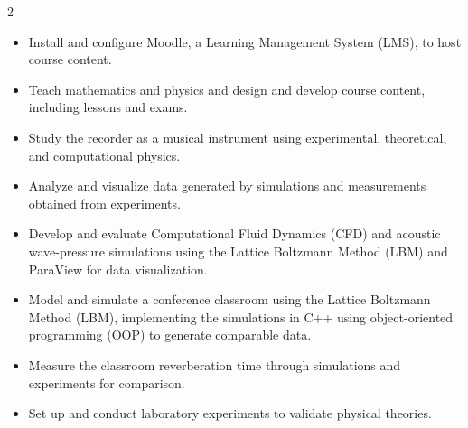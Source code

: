 \documentclass[10pt,legalpaper,ragged2e,withhyper]{altacv}
\begin{document}
\begin{paracol}{2}
\begin{itemize}
\item Install and configure Moodle, a Learning Management System (LMS), to host course content.

\item Teach mathematics and physics and design and develop course content, including lessons and exams.


\end{itemize}

\divider

\begin{itemize}
\item Study the recorder as a musical instrument using experimental, theoretical, and computational physics.

\item Analyze and visualize data generated by simulations and measurements obtained from experiments.

\item Develop and evaluate Computational Fluid Dynamics (CFD) and acoustic wave-pressure simulations using the Lattice Boltzmann Method (LBM) and ParaView for data visualization.

\end{itemize}

\divider

\begin{itemize}
\item Model and simulate a conference classroom using the Lattice Boltzmann Method (LBM), implementing the simulations in C++ using object-oriented programming (OOP) to generate comparable data.

\item Measure the classroom reverberation time through simulations and experiments for comparison.
\end{itemize}

\divider

\begin{itemize}
\item Set up and conduct laboratory experiments to validate physical theories.


\end{itemize}
\end{paracol}
\end{document}
